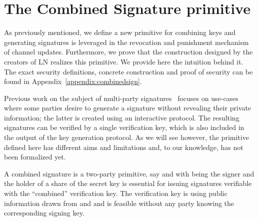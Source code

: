 \section{The Combined Signature primitive}
\label{sec:ov-combined-ds}
  As previously mentioned, we define a new primitive for combining keys and
  generating signatures is leveraged in the revocation and
  punishment mechanism of channel updates. Furthermore, we prove that the
  construction designed by the creators of LN realizes this primitive. We 
  provide here 
  the intuition behind it. The exact security definitions, concrete construction
  and proof of security can be found in Appendix~\ref{appendix:combinedsign}.

  Previous work on the subject of multi-party
signatures~\cite{DBLP:conf/ndss/NicolosiKDM03,DBLP:journals/iacr/BellareS01,boyd1986digital,DBLP:conf/ndss/Ganesan95a,DBLP:conf/crypto/MacKenzieR01,ganesan1994secure}
  focuses on use-cases where some parties desire to generate a signature without
  revealing their private information; the latter is created using an
  interactive protocol. The resulting signatures can be verified by a single
  verification key, which is also included in the output of the key generation
  protocol. As we will see however, the primitive defined here has different
  aims and limitations and, to our knowledge, has not been formalized yet.

  A combined signature is a two-party primitive, say  \alice{}
  and \bob\redden{,} with \bob{} being the signer and \alice{} the holder of a
  share of the secret key is essential for issuing
  signatures verifiable with the ``combined''
  verification key. The verification key is  using public
  information drawn from \alice{} and \bob{} and is feasible without any party
  knowing the corresponding signing key. 

